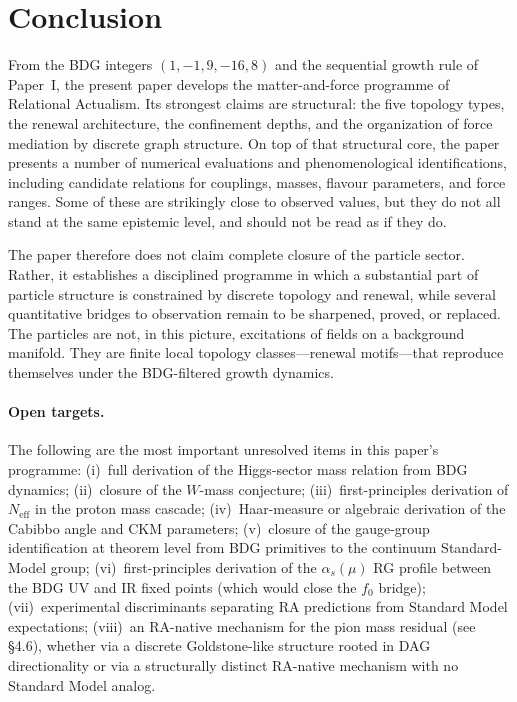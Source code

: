 \documentclass[11pt]{article}
\begin{document}
\section{Conclusion}
\label{sec:conclusion}

From the BDG integers $(1,-1,9,-16,8)$ and the sequential growth rule of Paper~I, the present paper develops the matter-and-force programme of Relational Actualism. Its strongest claims are structural: the five topology types, the renewal architecture, the confinement depths, and the organization of force mediation by discrete graph structure. On top of that structural core, the paper presents a number of numerical evaluations and phenomenological identifications, including candidate relations for couplings, masses, flavour parameters, and force ranges. Some of these are strikingly close to observed values, but they do not all stand at the same epistemic level, and should not be read as if they do.

The paper therefore does not claim complete closure of the particle sector. Rather, it establishes a disciplined programme in which a substantial part of particle structure is constrained by discrete topology and renewal, while several quantitative bridges to observation remain to be sharpened, proved, or replaced. The particles are not, in this picture, excitations of fields on a background manifold. They are finite local topology classes---renewal motifs---that reproduce themselves under the BDG-filtered growth dynamics.

\paragraph{Open targets.} The following are the most important unresolved items in this paper's programme: (i)~full derivation of the Higgs-sector mass relation from BDG dynamics; (ii)~closure of the $W$-mass conjecture; (iii)~first-principles derivation of $N_{\mathrm{eff}}$ in the proton mass cascade; (iv)~Haar-measure or algebraic derivation of the Cabibbo angle and CKM parameters; (v)~closure of the gauge-group identification at theorem level from BDG primitives to the continuum Standard-Model group; (vi)~first-principles derivation of the $\alpha_s(\mu)$ RG profile between the BDG UV and IR fixed points (which would close the $f_0$ bridge); (vii)~experimental discriminants separating RA predictions from Standard Model expectations; (viii)~an RA-native mechanism for the pion mass residual (see \S4.6), whether via a discrete Goldstone-like structure rooted in DAG directionality or via a structurally distinct RA-native mechanism with no Standard Model analog.
\end{document}
